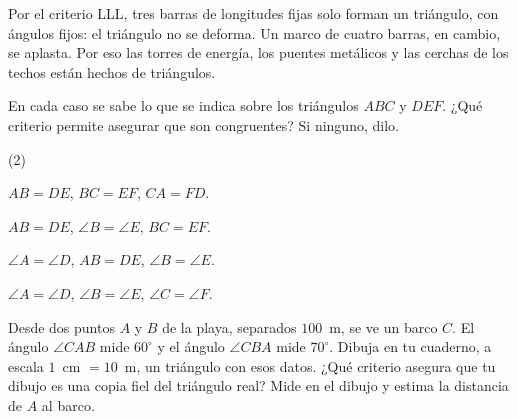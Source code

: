 \documentclass[11pt]{article}
\begin{document}
\begin{center}
\end{center}

\begin{aplicacion}
Por el criterio LLL, tres barras de longitudes fijas solo forman un
triángulo, con ángulos fijos: el triángulo no se deforma. Un marco de cuatro
barras, en cambio, se aplasta. Por eso las torres de energía, los puentes
metálicos y las cerchas de los techos están hechos de triángulos.
\end{aplicacion}

\begin{preguntas}
\pregunta En cada caso se sabe lo que se indica sobre los triángulos $ABC$
y $DEF$. ¿Qué criterio permite asegurar que son congruentes? Si ninguno,
dilo.
\begin{opciones*}(2)
  \item $AB = DE$, $BC = EF$, $CA = FD$.
  \item $AB = DE$, $\angle B = \angle E$, $BC = EF$.
  \item $\angle A = \angle D$, $AB = DE$, $\angle B = \angle E$.
  \item $\angle A = \angle D$, $\angle B = \angle E$, $\angle C = \angle F$.
\end{opciones*}
\espacio{3cm}
\pregunta Desde dos puntos $A$ y $B$ de la playa, separados $100$~m, se ve
un barco $C$. El ángulo $\angle CAB$ mide $60^\circ$ y el ángulo
$\angle CBA$ mide $70^\circ$. Dibuja en tu cuaderno, a escala
$1$~cm $= 10$~m, un triángulo con esos datos. ¿Qué criterio asegura que tu
dibujo es una copia fiel del triángulo real? Mide en el dibujo y estima la
distancia de $A$ al barco.
\espacio{3cm}
\end{preguntas}
\end{document}

